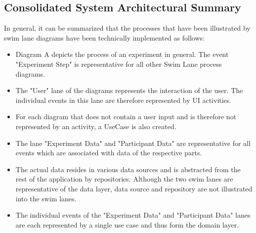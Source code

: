 \subsection{Consolidated System Architectural Summary}\label{subsec:completeArchitecture}

In general, it can be summarized that the processes that have been illustrated by swim lane diagrams have been technically implemented as follows:
\begin{itemize}
    \item Diagram A depicts the process of an experiment in general. The event "Experiment Step" is representative for all other Swim Lane process diagrams.
    \item The "User" lane of the diagrams represents the interaction of the user. The individual events in this lane are therefore represented by UI activities.
    \item For each diagram that does not contain a user input and is therefore not represented by an activity, a UseCase is also created.
    \item The lane "Experiment Data" and "Participant Data" are representative for all events which are associated with data of the respective parts. 
    \item The actual data resides in various data sources and is abstracted from the rest of the application by repositories. Although the two swim lanes are representative of the data layer, data source and repository are not illustrated into the swim lanes.
    \item The individual events of the "Experiment Data" and "Participant Data" lanes are each represented by a single use case and thus form the domain layer.
\end{itemize}








